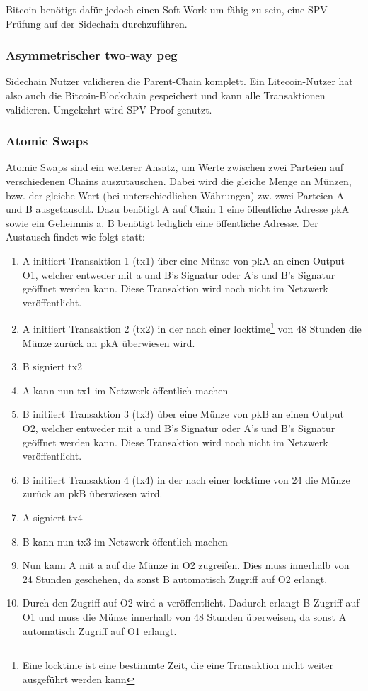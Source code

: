 Bitcoin benötigt dafür jedoch einen Soft-Work um fähig zu sein, eine \ac{SPV} Prüfung auf der Sidechain durchzuführen. 
\subsubsection{Asymmetrischer two-way peg}
Sidechain Nutzer validieren die Parent-Chain komplett. Ein Litecoin-Nutzer hat also auch die Bitcoin-Blockchain gespeichert und kann alle Transaktionen validieren.
Umgekehrt wird SPV-Proof genutzt.
\subsubsection{Atomic Swaps}
Atomic Swaps sind ein weiterer Ansatz, um Werte zwischen zwei Parteien auf verschiedenen Chains auszutauschen. Dabei wird die gleiche Menge an Münzen, bzw. der gleiche Wert (bei unterschiedlichen Währungen) zw. zwei Parteien A und B ausgetauscht. Dazu benötigt A auf Chain 1 eine öffentliche Adresse pkA sowie ein Geheimnis a. B benötigt lediglich eine öffentliche Adresse. Der Austausch findet wie folgt statt:
\begin{enumerate}
	\item A initiiert Transaktion 1 (tx1) über eine Münze von pkA an einen Output O1, welcher entweder mit a und B's Signatur oder A's und B's Signatur geöffnet werden kann. Diese Transaktion wird noch nicht im Netzwerk veröffentlicht.
	\item A initiiert Transaktion 2 (tx2) in der nach einer locktime\footnote{Eine locktime ist eine bestimmte Zeit, die eine Transaktion nicht weiter ausgeführt werden kann} von 48 Stunden die Münze zurück an pkA überwiesen wird.
	\item B signiert tx2
	\item A kann nun tx1 im Netzwerk öffentlich machen
	\item B initiiert Transaktion 3 (tx3) über eine Münze von pkB an einen Output O2, welcher entweder mit a und B's Signatur oder A's und B's Signatur geöffnet werden kann. Diese Transaktion wird noch nicht im Netzwerk veröffentlicht.
	\item B initiiert Transaktion 4 (tx4) in der nach einer locktime von 24 die Münze zurück an pkB überwiesen wird.
	\item A signiert tx4
	\item B kann nun tx3 im Netzwerk öffentlich machen
	\item Nun kann A mit a auf die Münze in O2 zugreifen. Dies muss innerhalb von 24 Stunden geschehen, da sonst B automatisch Zugriff auf O2 erlangt.
	\item Durch den Zugriff auf O2 wird a veröffentlicht. Dadurch erlangt B Zugriff auf O1 und muss die Münze innerhalb von 48 Stunden überweisen, da sonst A automatisch Zugriff auf O1 erlangt.
\end{enumerate}\cite{TierNolan.2013}


